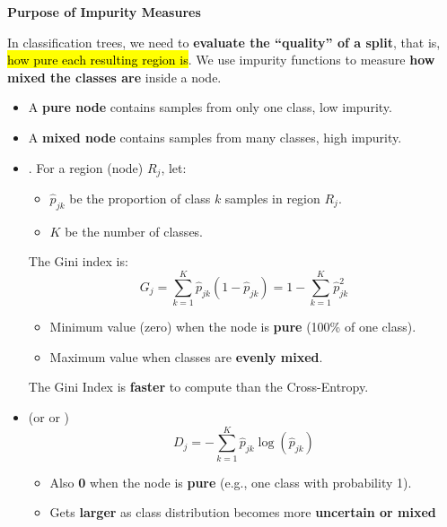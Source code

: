 \highspace
\begin{flushleft}
    \textcolor{Green3}{ \textbf{Purpose of Impurity Measures}}
\end{flushleft}
In classification trees, we need to \textbf{evaluate the ``quality'' of a split}, that is, \hl{how pure each resulting region is}. We use impurity functions to measure \textbf{how mixed the classes are} inside a node.
\begin{itemize}
    \item A \textbf{pure node} contains samples from only one class, low impurity.
    \item A \textbf{mixed node} contains samples from many classes, high impurity.
    \item {}. For a region (node) $R_j$, let:
    \begin{itemize}
        \item $\hat{p}_{jk}$ be the proportion of class $k$ samples in region $R_j$.
        \item $K$ be the number of classes.
    \end{itemize}
    The Gini index is:
    \begin{equation}
        G_j = \sum_{k=1}^K \hat{p}_{jk} \left(1 - \hat{p}_{jk}\right) = 1 - \sum_{k=1}^K \hat{p}_{jk}^2
    \end{equation}
    \begin{itemize}
        \item Minimum value (zero) when the node is \textbf{pure} (100\% of one class).
        \item Maximum value when classes are \textbf{evenly mixed}.
    \end{itemize}
    The Gini Index is \textbf{faster} to compute than the Cross-Entropy.
    \item {} (or  or )
    \begin{equation}
        D_j = -\sum_{k=1}^K \hat{p}_{jk} \log\left(\hat{p}_{jk}\right)
    \end{equation}
    \begin{itemize}
        \item Also \textbf{0} when the node is \textbf{pure} (e.g., one class with probability 1).
        \item Gets \textbf{larger} as class distribution becomes more \textbf{uncertain or mixed}
    \end{itemize}
\end{itemize}